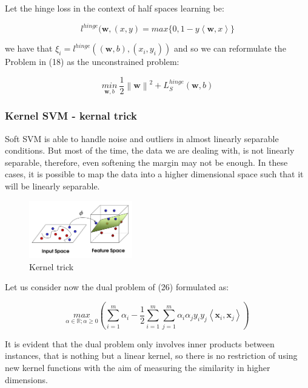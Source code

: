 \documentclass{article}
\begin{document}
Let the hinge loss in the context of half spaces learning be:

\begin{equation}
l^{hinge}(\textbf{w},(x,y) = max\{0,1-y\left \langle \textbf{w},x \right \rangle\} 
\end{equation}

we have that $\xi_{i} = l^{hinge}((\textbf{w}, b),(x_{i}, y_{i}))$ and so we can reformulate the Problem in (18) as the unconstrained problem:

\begin{equation}
\underset{\textbf{w},b}{min} ~ \frac{1}{2}\left \| \textbf{w} \right \|^{2} + L_{S}^{hinge}(\textbf{w},b)
\end{equation}


\subsubsection{Kernel SVM - kernal trick}
Soft SVM is able to handle noise and outliers in almost linearly separable conditions.
But most of the time, the data we are dealing with, is not linearly separable, therefore, even softening the margin may not be enough. In these cases, it is possible to map the data into a higher dimensional space such that it will be linearly separable.

\begin{figure}[h]
\centering
\includegraphics[width=0.4\textwidth]{kernel.png}
\caption{Kernel trick}
\end{figure}

Let us consider now the dual problem of (26) formulated as:

\begin{equation}
\underset{\alpha\in\mathbb{R};\alpha\geq0}{max}(\sum_{i=1}^{m}\alpha_{i}-\frac{1}{2}\sum_{i=1}^{m}\sum_{j=1}^{m}\alpha_{i}\alpha_{j}y_{i}y_{j}\left \langle \textbf{x}_{i}, \textbf{x}_{j} \right \rangle)
\end{equation}

It is evident that the dual problem only involves inner products between instances, that is nothing but a linear kernel, so there is no restriction of using new kernel functions with the aim of measuring the similarity in higher dimensions.
\end{document}
